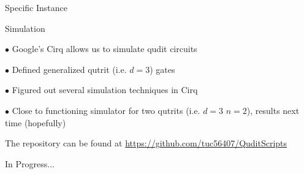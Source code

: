 \documentclass[xcolor=dvipsnames]{beamer}
\begin{document}
\begin{frame}{Specific Instance}

\end{frame}

\begin{frame}{Simulation}

$\bullet$ Google's Cirq allows us to simulate qudit circuits

\medskip\pause

$\bullet$ Defined generalized qutrit (i.e. $d=3$) gates

\medskip\pause

$\bullet$ Figured out several simulation techniques in Cirq

\medskip\pause 

$\bullet$ Close to functioning simulator for two qutrits (i.e. $d=3$ $n=2$)\pause , results next time \pause(hopefully)

\vspace{1cm}

The repository can be found at \url{https://github.com/tuc56407/QuditScripts}

\end{frame}

{ %
    \begin{frame}{In Progress...}
     \end{frame}
}
\end{document}
